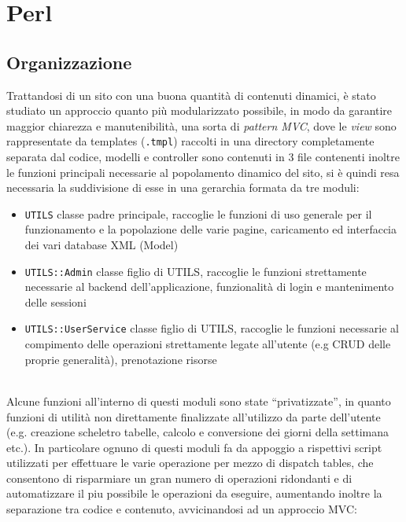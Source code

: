\section{Perl}

\subsection{Organizzazione}

Trattandosi di un sito con una buona quantità di contenuti dinamici, è stato studiato un approccio quanto più modularizzato possibile, in modo da garantire maggior chiarezza e manutenibilità, una sorta di \textit{pattern MVC}, dove le \textit{view} sono rappresentate da templates (\texttt{.tmpl}) raccolti in una directory completamente separata dal codice, modelli e controller sono contenuti in 3 file contenenti inoltre le funzioni principali necessarie al popolamento dinamico del sito, si è quindi resa necessaria la suddivisione di esse in una gerarchia formata da tre moduli:

\begin{itemize}

  \item \texttt{UTILS} classe padre principale, raccoglie le funzioni di uso generale per il funzionamento e la popolazione delle varie pagine, caricamento ed interfaccia dei vari database XML (Model)
  \item \texttt{UTILS::Admin} classe figlio di UTILS, raccoglie le funzioni strettamente necessarie al backend dell'applicazione, funzionalità di login e mantenimento delle sessioni
  \item \texttt{UTILS::UserService} classe figlio di UTILS, raccoglie le funzioni necessarie al compimento delle operazioni strettamente legate all'utente (e.g CRUD delle proprie generalità), prenotazione risorse

\end{itemize}
\leavevmode \\
Alcune funzioni all'interno di questi moduli sono state ``privatizzate'', in quanto funzioni di utilità non direttamente finalizzate all'utilizzo da parte dell'utente (e.g. creazione scheletro tabelle, calcolo e conversione dei giorni della settimana etc.). 
In particolare ognuno di questi moduli fa da appoggio a rispettivi script utilizzati per effettuare le varie operazione per mezzo di dispatch tables, che consentono di risparmiare un gran numero di operazioni ridondanti e di automatizzare il piu possibile le operazioni da eseguire, aumentando inoltre la separazione tra codice e contenuto, avvicinandosi ad un approccio MVC:

